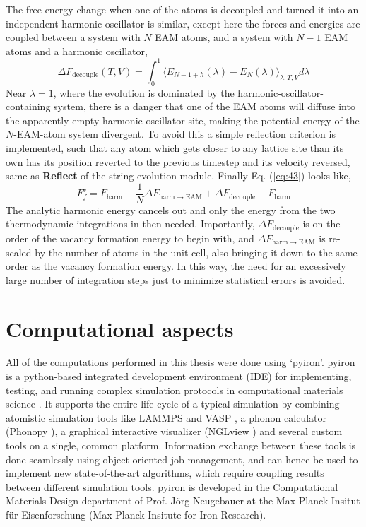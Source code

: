 \documentclass{article}
\begin{document}
The free energy change when one of the atoms is decoupled and turned it into an independent harmonic oscillator is similar, except here the forces and energies are coupled between a system with $N$ EAM atoms, and a system with $N-1$ EAM atoms and a harmonic oscillator,
%
\begin{equation} \label{eq:46}
\Delta F_\mathrm{decouple}(T, V) = \int_0^1 \langle E_{N-1+h}(\lambda) - E_N(\lambda) \rangle_{\lambda, T, V} d\lambda
\end{equation}
%
Near $\lambda=1$, where the evolution is dominated by the harmonic-oscillator-containing system, there is a danger that one of the EAM atoms will diffuse into the apparently empty harmonic oscillator site, making the potential energy of the $N$-EAM-atom system divergent. To avoid this a simple reflection criterion is implemented, such that any atom which gets closer to any lattice site than its own has its position reverted to the previous timestep and its velocity reversed, same as \textbf{Reflect} of the string evolution module. Finally Eq. (\ref{eq:43}) looks like,
%
\begin{equation} \label{eq:47}
F_f^v  = F_\mathrm{harm} + \frac{1}{N}\Delta F_\mathrm{harm \rightarrow EAM} + \Delta F_\mathrm{decouple} - F_\mathrm{harm}
\end{equation}
%
The analytic harmonic energy cancels out and only the energy from the two thermodynamic integrations in then needed. Importantly, $\Delta F_\mathrm{decouple}$ is on the order of the vacancy formation energy to begin with, and $\Delta F_\mathrm{harm \rightarrow EAM}$ is re-scaled by the number of atoms in the unit cell, also bringing it down to the same order as the vacancy formation energy. In this way, the need for an excessively large number of integration steps just to minimize statistical errors is avoided. \\

\newpage
\section{Computational aspects}\label{cas}

All of the computations performed in this thesis were done using \enquote*{pyiron}. pyiron is a python-based integrated development environment (IDE) for implementing, testing, and running complex simulation protocols in computational materials science \cite{Janssen2019}. It supports the entire life cycle of a typical simulation by combining atomistic simulation tools like LAMMPS \cite{Plimpton1995} and VASP \cite{Kresse1993, Kresse1996a, Kresse1996}, a phonon calculator (Phonopy \cite{Togo2015}), a graphical interactive visualizer (NGLview \cite{Nguyen2018}) and several custom tools on a single, common platform. Information exchange between these tools is done seamlessly using object oriented job management, and can hence be used to implement new state-of-the-art algorithms, which require coupling results between different simulation tools. pyiron is developed in the Computational Materials Design department of Prof. Jörg Neugebauer at the Max Planck Insitut für Eisenforschung (Max Planck Insitute for Iron Research). 
\end{document}
